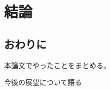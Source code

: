 \chapter{結論}
\label{chap:conclusion}

\section{おわりに}\label{ux304aux308fux308aux306b}

本論文でやったことをまとめる。

今後の展望について語る
